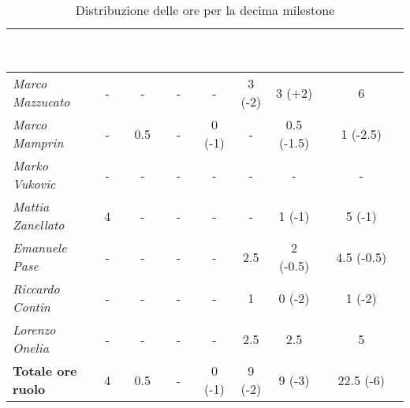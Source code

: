 \begin{table}[H]
    \renewcommand\arraystretch{1.5}
    \small
    \centering
        \begin{tabular}{|l|c|c|c|c|c|c|c|}
            \hline
            \rowcolor[HTML]{036400}
            \textcolor{white}{\textbf{Membro}} & \multicolumn{1}{c|}{\textcolor{white}{\textbf{RE}}} & \multicolumn{1}{c|}{\textcolor{white}{\textbf{AM}}} & \multicolumn{1}{c|}{\textcolor{white}{\textbf{AN}}} & \multicolumn{1}{c|}{\textcolor{white}{\textbf{PT}}} & \multicolumn{1}{c|}{\textcolor{white}{\textbf{PR}}} & \multicolumn{1}{c|}{\textcolor{white}{\textbf{VE}}} & \multicolumn{1}{c|}{\textcolor{white}{\textbf{Totale ore persona}}} \\ \hline
            \rowcolor[HTML]{EFEFEF}\textit{Marco Mazzucato}  & -         & -        & -          & -        & 3 (-2)       & 3 (+2)           & 6    \\ \hline
            \rowcolor[HTML]{C0C0C0}\textit{Marco Mamprin}    & -         & 0.5          & -          & 0 (-1)      & -  & 0.5 (-1.5)         & 1 (-2.5)          \\ \hline
            \rowcolor[HTML]{EFEFEF}\textit{Marko Vukovic}    & -         & -          & -          & -        & -       & -           & -           \\ \hline
            \rowcolor[HTML]{C0C0C0}\textit{Mattia Zanellato} & 4         & -        & -          & -        & -       & 1 (-1)           & 5 (-1)      \\ \hline
            \rowcolor[HTML]{EFEFEF}\textit{Emanuele Pase}    & -         & -          & -          & -        & 2.5   & 2 (-0.5)    & 4.5 (-0.5)      \\ \hline
            \rowcolor[HTML]{C0C0C0}\textit{Riccardo Contin}  & -         & -          & -          & -        & 1     & 0 (-2)           & 1 (-2)          \\ \hline
            \rowcolor[HTML]{EFEFEF}\textit{Lorenzo Onelia}   & -         & -          & -          & -        & 2.5       & 2.5       & 5        \\ \hline
            \rowcolor[HTML]{C0C0C0}\textbf{Totale ore ruolo} & 4         & 0.5          & -          & 0 (-1) & 9 (-2) & 9 (-3) & 22.5 (-6)  \\ \hline
        \end{tabular}
    \caption{Distribuzione delle ore per la decima milestone}
\end{table}

